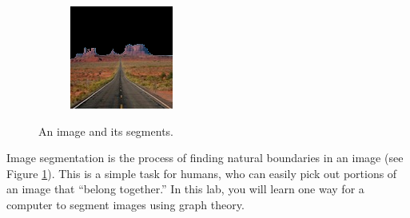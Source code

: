 \begin{figure}
\begin{subfigure}{0.31\textwidth}
    \end{subfigure}
    \hspace*{\fill}
    \begin{subfigure}{0.31\textwidth}
        \includegraphics[width=\textwidth]{figures/PosMon.png}
    \end{subfigure}

\caption{An image and its segments.}
\label{fig:monument}
\end{figure}
Image segmentation is the process of finding natural boundaries in an image (see Figure \ref{fig:monument}).
This is a simple task for humans, who can easily pick out portions of an image that ``belong together.''
In this lab, you will learn one way for a computer to segment images using graph theory.

